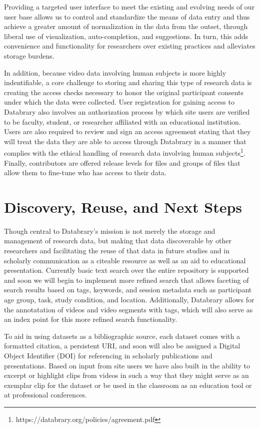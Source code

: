 \documentclass{sig-alternate}
\begin{document}
Providing a targeted user interface to meet the existing and evolving needs of our user base allows us to control and standardize the means of data entry and thus achieve a greater amount of normalization in the data from the outset, through liberal use of visualization, auto-completion, and suggestions.
In turn, this adds convenience and functionality for researchers over existing practices and alleviates storage burdens.

In addition, because video data involving human subjects is more highly indentifiable, a core challenge to storing and sharing this type of research data is creating the access checks necessary to honor the original participant consents under which the data were collected. 
User registration for gaining access to Databrary also involves an authorization process by which site users are verified to be faculty, student, or researcher affiliated with an educational institution.
Users are also required to review and sign an access agreement stating that they will treat the data they are able to access through Databrary in a manner that complies with the ethical handling of research data involving human subjects\footnote{https://databrary.org/policies/agreement.pdf}.
Finally, contributors are offered release levels for files and groups of files that allow them to fine-tune who has access to their data. 

\section{Discovery, Reuse, and Next Steps}

Though central to Databrary's mission is not merely the storage and management of research data, but making that data discoverable by other researchers and facilitating the reuse of that data in future studies and in scholarly communication as a citeable resource as well as an aid to educational presentation.
Currently basic text search over the entire repository is supported and soon we will begin to implement more refined search that allows faceting of search results based on tags, keywords, and session metadata such as participant age group, task, study condition, and location.
Additionally, Databrary allows for the annotatation of videos and video segments with tags, which will also serve as an index point for this more refined search functionality.  

To aid in using datasets as a bibliographic source, each dataset comes with a formatted citation, a persistent URI, and soon will also be assigned a Digital Object Identifier (DOI) for referencing in scholarly publications and presentations.
Based on input from site users we have also built in the ability to excerpt or highlight clips from videos in such a way that they might serve as an exemplar clip for the dataset or be used in the classroom as an education tool or at professional conferences.
\end{document}
